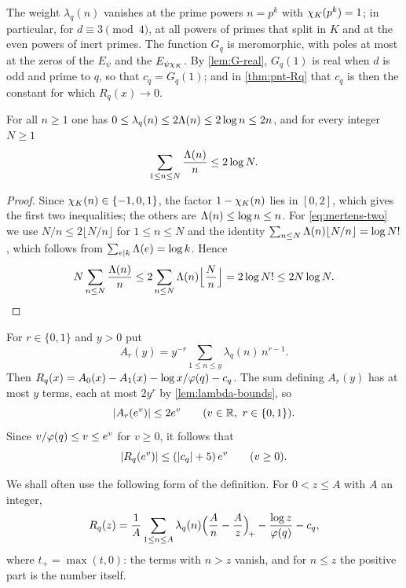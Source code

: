 The weight $\lambda_q(n)$ vanishes at the prime powers $n=p^k$ with $\chi_K(p^k)=1$; in particular,
for $d\equiv 3\pmod 4$, at all powers of primes that split in $K$ and at the even powers of inert
primes. The function $G_q$ is meromorphic, with poles at most at the zeros of the $E_\psi$ and the
$E_{\psi\chi_K}$. By \cref{lem:G-real}, $G_q(1)$ is real when $d$ is odd and prime
to $q$, so that $c_q=G_q(1)$; and in \cref{thm:pnt-Rq} that $c_q$ is then the constant for which
$R_q(x)\to0$.

\begin{lemma}\label{lem:lambda-bounds}
For all $n\ge1$ one has $0\le\lambda_q(n)\le2\Lambda(n)\le2\log n\le 2n$, and for every integer
$N\ge1$
\begin{equation}\label{eq:mertens-two}
  \sum_{1\le n\le N}\frac{\Lambda(n)}{n}\le 2\log N.
\end{equation}
\end{lemma}

\begin{proof}
Since $\chi_K(n)\in\{-1,0,1\}$, the factor $1-\chi_K(n)$ lies in $[0,2]$, which gives the first two
inequalities; the others are $\Lambda(n)\le\log n\le n$. For \eqref{eq:mertens-two} we use
$N/n\le 2\lfloor N/n\rfloor$ for $1\le n\le N$ and the identity
$\sum_{n\le N}\Lambda(n)\lfloor N/n\rfloor=\log N!$, which follows from $\sum_{e\mid k}\Lambda(e)=\log k$.
Hence
\[
  N\sum_{n\le N}\frac{\Lambda(n)}{n}\le 2\sum_{n\le N}\Lambda(n)\Bigl\lfloor\frac Nn\Bigr\rfloor
  =2\log N!\le 2N\log N.\qedhere
\]
\end{proof}

For $r\in\{0,1\}$ and $y>0$ put
\[
  A_r(y)=y^{-r}\sum_{1\le n\le y}\lambda_q(n)\,n^{r-1}.
\]
Then $R_q(x)=A_0(x)-A_1(x)-\log x/\varphi(q)-c_q$. The sum defining $A_r(y)$ has at most $y$ terms,
each at most $2y^r$ by \cref{lem:lambda-bounds}, so
\begin{equation}\label{eq:Ar-bound}
  \lvert A_r(e^v)\rvert\le 2e^v\qquad(v\in\mathbb{R},\ r\in\{0,1\}).
\end{equation}
Since $v/\varphi(q)\le v\le e^v$ for $v\ge0$, it follows that
\begin{equation}\label{eq:R-growth}
  \lvert R_q(e^v)\rvert\le(\lvert c_q\rvert+5)\,e^v\qquad(v\ge0).
\end{equation}

We shall often use the following form of the definition. For $0<z\le A$ with $A$ an integer,
\begin{equation}\label{eq:R-posPart}
  R_q(z)=\frac1A\sum_{1\le n\le A}\lambda_q(n)\Bigl(\frac An-\frac Az\Bigr)_{\!+}
  -\frac{\log z}{\varphi(q)}-c_q,
\end{equation}
where $t_+=\max(t,0)$: the terms with $n>z$ vanish, and for $n\le z$ the positive part is the
number itself.


